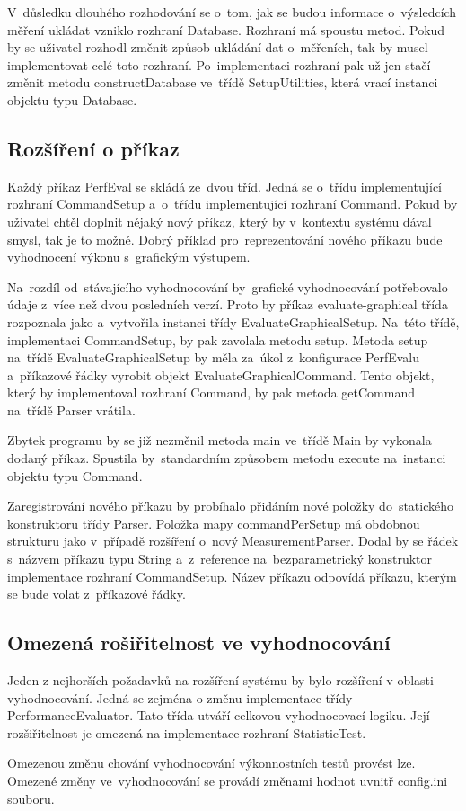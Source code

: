 V~důsledku dlouhého rozhodování se o~tom, jak se budou informace o~výsledcích měření ukládat vzniklo rozhraní Database.
Rozhraní má spoustu metod. Pokud by se uživatel rozhodl změnit způsob ukládání dat o~měřeních, tak by
musel implementovat celé toto rozhraní. Po~implementaci rozhraní pak už jen stačí změnit metodu constructDatabase ve~třídě
SetupUtilities, která vrací instanci objektu typu Database.

\subsection{Rozšíření o příkaz}

Každý příkaz PerfEval se skládá ze~dvou tříd. Jedná se o~třídu implementující rozhraní CommandSetup
a~o~třídu implementující rozhraní Command. Pokud by uživatel chtěl doplnit nějaký nový příkaz,
který by v~kontextu systému dával smysl, tak je to možné. Dobrý příklad pro~reprezentování nového příkazu
bude vyhodnocení výkonu s~grafickým výstupem.

Na~rozdíl od~stávajícího vyhodnocování by~grafické vyhodnocování potřebovalo údaje z~více než dvou posledních verzí.
Proto by příkaz evaluate-graphical třída rozpoznala jako a~vytvořila instanci třídy EvaluateGraphicalSetup.
Na~této třídě, implementaci CommandSetup, by pak zavolala metodu setup. Metoda setup na~třídě EvaluateGraphicalSetup
by měla za~úkol z~konfigurace PerfEvalu a~příkazové řádky vyrobit objekt EvaluateGraphicalCommand. Tento objekt, který
by implementoval rozhraní Command, by pak metoda getCommand na~třídě Parser vrátila.

Zbytek programu by se již nezměnil metoda main ve~třídě Main by vykonala dodaný příkaz. Spustila by~standardním způsobem
metodu execute na~instanci objektu typu Command.

Zaregistrování nového příkazu by probíhalo přidáním nové položky do~statického konstruktoru třídy Parser.
Položka mapy commandPerSetup má obdobnou strukturu jako v~případě rozšíření o~nový MeasurementParser.
Dodal by se řádek s~názvem příkazu typu String a~z~reference na~bezparametrický konstruktor
implementace rozhraní CommandSetup. Název příkazu odpovídá příkazu, kterým se bude volat z~příkazové řádky.

\subsection{Omezená rošiřitelnost ve vyhodnocování}

Jeden z nejhorších požadavků na rozšíření systému by bylo rozšíření v oblasti vyhodnocování.
Jedná se zejména o změnu implementace třídy PerformanceEvaluator. Tato třída utváří
celkovou vyhodnocovací logiku. Její rozšiřitelnost je omezená na implementace rozhraní
StatisticTest.

Omezenou změnu chování vyhodnocování výkonnostních testů provést lze. Omezené změny ve~vyhodnocování
se provádí změnami hodnot uvnitř config.ini souboru.